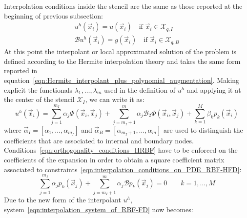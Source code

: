 Interpolation conditions inside the stencil are the same as those reported at the beginning of previous subsection:
\begin{subequations}
	\label{eqn:interpolation_conditions_on_PDE_RBF-HFD}
	\begin{gather}
		u^h(\vec{x}_i) = u(\vec{x}_i) \quad \text{if $\vec{x}_i \in \mathcal{X}_{q,I}$}  				\\
		\mathcal{B} u^h(\vec{x}_i) = g(\vec{x}_i) \quad \text{if $\vec{x}_i \in \mathcal{X}_{q,B}$}
	\end{gather}
\end{subequations}
At this point the interpolant or local approximated solution of the problem is defined according to the Hermite interpolation theory and takes the same form reported in equation~\eqref{eqn:Hermite_interpolant_plus_polynomial_augmentation}. Making explicit the functionals $\lambda_1, \dots, \lambda_m$ used in the definition of $u^h$ and applying it at the center of the stencil $\mathcal{X}_I$, we can write it as:
\begin{equation}
	\label{eqn:local_RBF-FD_interpolant_to_be_modified}
	u^h(\vec{x}_i) = \sum_{j=1}^{m_I} \alpha_j \Phi(\vec{x}_i, \vec{x}_j) + \sum_{j=m_I+1}^{m} \alpha_j \mathcal{B}_2\Phi(\vec{x}_i, \vec{x}_j) + \sum_{k=1}^{M} \beta_k p_k(\vec{x}_i)
\end{equation}
where $\vec{\alpha}_I = [\alpha_1, \dots, \alpha_{m_I}]$ and $\vec{\alpha}_B = [\alpha_{m_I+1}, \dots, \alpha_{m}]$ are used to distinguish the coefficients that are associated to internal and boundary nodes. Conditions~\eqref{eqn:orthogonality_conditions_HRBF} have to be enforced on the coefficients of the expansion in order to obtain a square coefficient matrix associated to constraints~\eqref{eqn:interpolation_conditions_on_PDE_RBF-HFD}:
\begin{equation}
	\sum_{j=1}^{m_I} \alpha_j p_k(\vec{x}_j) + \sum_{j={m_I+1}}^{m} \alpha_j \mathcal{B} p_k(\vec{x}_j)= 0 \qquad k=1, \dots, M
\end{equation}
Due to the new form of the interpolant $u^h$, system~\eqref{eqn:interpolation_system_of_RBF-FD} now becomes:
